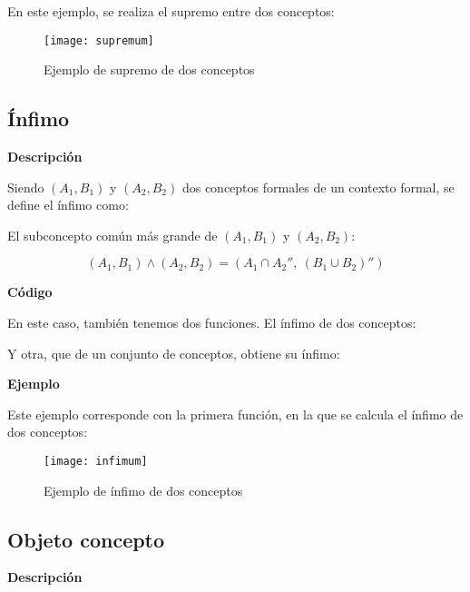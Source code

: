         En este ejemplo, se realiza el supremo entre dos conceptos:

        \begin{figure}[H]
            \centering
            \texttt{[image: supremum]}
            \caption{Ejemplo de supremo de dos conceptos}
            \label{fig:supremum}
        \end{figure}


    \subsection{\'Infimo}

    
        \textbf{Descripci\'on}

        Siendo \((A_{1}, B_{1}) \) y \( (A_{2}, B_{2})\) dos conceptos formales de un contexto formal, se define el \'infimo como:

        El subconcepto com\'un m\'as grande de \((A_{1}, B_{1}) \) y \( (A_{2}, B_{2})\):

        \[ (A_{1}, B_{1}) \wedge (A_{2}, B_{2}) = (A_{1} \cap A_{2}'', ~ (B_{1}\cup B_{2})'') \]

        \clearpage

        \textbf{C\'odigo}

        En este caso, tambi\'en tenemos dos funciones. El \'infimo de dos conceptos:

        

        Y otra, que de un conjunto de conceptos, obtiene su \'infimo:

        

        \bigskip

        \textbf{Ejemplo}

        Este ejemplo corresponde con la primera funci\'on, en la que se calcula el \'infimo de dos conceptos:

        \begin{figure}[H]
            \centering
            \texttt{[image: infimum]}
            \caption{Ejemplo de \'infimo de dos conceptos}
            \label{fig:infimum}
        \end{figure}



    \subsection{Objeto concepto}

    
        \textbf{Descripci\'on}

